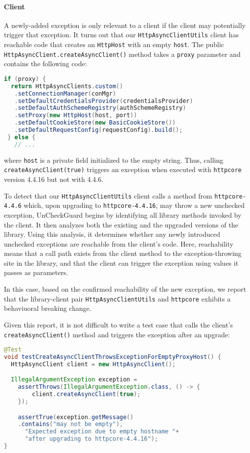 \paragraph{Client} A newly-added exception is only relevant to a client if the client may potentially
trigger that exception. It turns out that our \texttt{HttpAsyncClientUtils} client has reachable code
that creates an \texttt{HttpHost} with an empty \texttt{host}. The
public \texttt{HttpAsyncClient.createAsyncClient()} method
takes a \texttt{proxy} parameter and contains the following code:
\begin{lstlisting}[language=Java,basicstyle=\scriptsize\ttfamily]
 if (proxy) {
  return HttpAsyncClients.custom()
   .setConnectionManager(conMgr)
   .setDefaultCredentialsProvider(credentialsProvider)
   .setDefaultAuthSchemeRegistry(authSchemeRegistry)
   .setProxy(new HttpHost(host, port))
   .setDefaultCookieStore(new BasicCookieStore())
   .setDefaultRequestConfig(requestConfig).build();
 } else {
   // ...
\end{lstlisting}
where \texttt{host} is a private field initialized to the empty string.
Thus, calling \texttt{createAsyncClient(true)} triggers an exception when executed with
\texttt{httpcore} version 4.4.16 but not with 4.4.6.

To detect that our \texttt{HttpAsyncClientUtils} client calls a method from \texttt{httpcore-4.4.6} which, upon upgrading to \texttt{httpcore-4.4.16}, may throw a new unchecked exception, UnCheckGuard begins by identifying all library methods invoked by the client. It then analyzes both the existing and the upgraded versions of the library. Using this analysis, it determines whether any newly introduced unchecked exceptions are reachable from the client's code. Here, reachability means that a call path exists from the client method to the exception-throwing site in the library, and that the client can trigger the exception using values it passes as parameters.

In this case, based on the confirmed reachability of the new exception, we report that the library-client pair \texttt{HttpAsyncClientUtils} and \texttt{httpcore} exhibits a behaviuoral breaking change.

Given this report, it is not difficult to write a test case that calls the client's \texttt{createAsyncClient()} method
and triggers the exception after an upgrade:
\begin{lstlisting}[language=Java,basicstyle=\scriptsize\ttfamily]
@Test
void testCreateAsyncClientThrowsExceptionForEmptyProxyHost() {
  HttpAsyncClient client = new HttpAsyncClient();

  IllegalArgumentException exception =
    assertThrows(IllegalArgumentException.class, () -> {
        client.createAsyncClient(true);
    });

    assertTrue(exception.getMessage()
    .contains("may not be empty"),
      "Expected exception due to empty hostname "+
      "after upgrading to httpcore-4.4.16");
}
\end{lstlisting}





